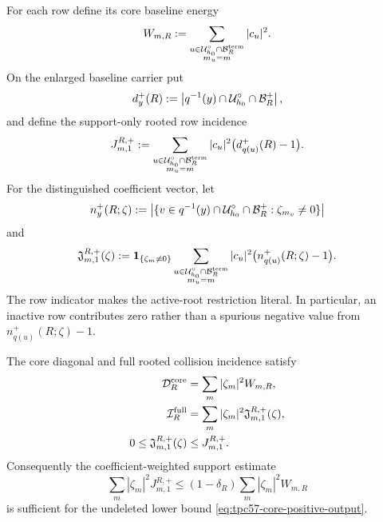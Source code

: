 For each row define its core baseline energy
\begin{equation}
 W_{m,R}
 :=\sum_{\substack{u\in\mathcal U_{h_0}^{\circ}\cap\mathcal B_R^{\rm term}\\
                   m_u=m}}|c_u|^2.
 \label{eq:tpc57-core-row-weight}
\end{equation}
On the enlarged baseline carrier put
\begin{equation}
 d_y^+(R)
 :=\left|q^{-1}(y)\cap\mathcal U_{h_0}^{\circ}\cap\mathcal B_R^+\right|,
 \label{eq:tpc57-enlarged-baseline-degree}
\end{equation}
and define the support-only rooted row incidence
\begin{equation}
 J_{m,1}^{R,+}
 :=\sum_{\substack{u\in\mathcal U_{h_0}^{\circ}\cap\mathcal B_R^{\rm term}\\
                   m_u=m}}
 |c_u|^2\bigl(d_{q(u)}^+(R)-1\bigr).
 \label{eq:tpc57-enlarged-baseline-row-incidence}
\end{equation}
For the distinguished coefficient vector, let
\begin{equation}
 n_y^+(R;\zeta)
 :=\left|\{v\in q^{-1}(y)\cap\mathcal U_{h_0}^{\circ}\cap\mathcal B_R^+:
                   \zeta_{m_v}\ne0\}\right|
 \label{eq:tpc57-enlarged-active-row-degree}
\end{equation}
and
\begin{equation}
 \mathfrak J_{m,1}^{R,+}(\zeta)
 :=\mathbf 1_{\{\zeta_m\ne0\}}
   \sum_{\substack{u\in\mathcal U_{h_0}^{\circ}\cap\mathcal B_R^{\rm term}\\
                   m_u=m}}
 |c_u|^2\bigl(n_{q(u)}^+(R;\zeta)-1\bigr).
 \label{eq:tpc57-enlarged-physical-row-incidence}
\end{equation}
The row indicator makes the active-root restriction literal.  In
particular, an inactive row contributes zero rather than a spurious negative
value from \(n_{q(u)}^+(R;\zeta)-1\).

\begin{proposition}
\label{prop:tpc57-weighted-incidence-factorization}
The core diagonal and full rooted collision incidence satisfy
\begin{align}
 \mathcal D_R^{\rm core}
 &=\sum_m|\zeta_m|^2W_{m,R},
 \label{eq:tpc57-weighted-core-energy}\\
 \mathcal I_R^{\rm full}
 &=\sum_m|\zeta_m|^2
   \mathfrak J_{m,1}^{R,+}(\zeta),
 \label{eq:tpc57-exact-weighted-physical-incidence}\\
 0\le\mathfrak J_{m,1}^{R,+}(\zeta)
 &\le J_{m,1}^{R,+}.
 \label{eq:tpc57-physical-baseline-incidence-order}
\end{align}
Consequently the coefficient-weighted support estimate
\begin{equation}
 \sum_m|\zeta_m|^2J_{m,1}^{R,+}
 \le(1-\delta_R)\sum_m|\zeta_m|^2W_{m,R}
 \label{eq:tpc57-baseline-weighted-collision-target}
\end{equation}
is sufficient for the undeleted lower bound
\eqref{eq:tpc57-core-positive-output}.
\end{proposition}

